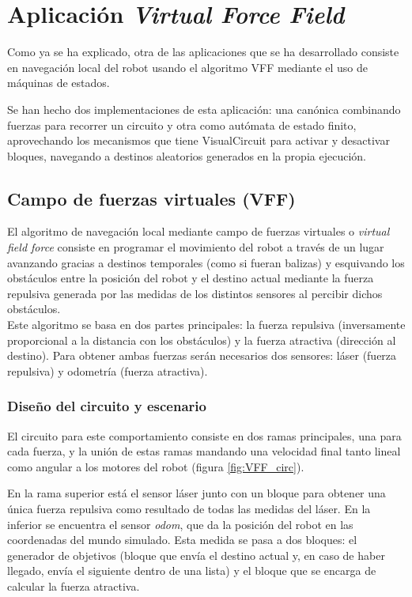 \chapter{Aplicación \textit{Virtual Force Field}}
\label{cap:capitulo6}
Como ya se ha explicado, otra de las aplicaciones que se ha desarrollado consiste en navegación local del robot usando el algoritmo VFF
mediante el uso de máquinas de estados.

Se han hecho dos implementaciones de esta aplicación: una canónica combinando fuerzas para recorrer un circuito y otra
como autómata de estado finito, aprovechando los mecanismos que tiene VisualCircuit para activar y desactivar bloques, navegando a destinos aleatorios
generados en la propia ejecución.

\section{Campo de fuerzas virtuales (VFF)}
\label{sec:VFF}

El algoritmo de navegación local mediante campo de fuerzas virtuales o \textit{virtual field force} consiste en programar el movimiento del robot a
través de un lugar avanzando gracias a destinos temporales (como si fueran balizas) y esquivando los obstáculos entre la posición del robot
y el destino actual mediante la fuerza repulsiva generada por las medidas de los distintos sensores al percibir dichos obstáculos.\\

Este algoritmo se basa en dos partes principales: la fuerza repulsiva (inversamente proporcional a la distancia con los obstáculos) y la
fuerza atractiva (dirección al destino). Para obtener ambas fuerzas serán necesarios dos sensores: láser (fuerza repulsiva) y odometría (fuerza atractiva).\\

\subsection{Diseño del circuito y escenario}
\label{subsec:dis_bloques_VFF}

El circuito para este comportamiento consiste en dos ramas principales, una para cada fuerza, y la unión de estas ramas mandando una velocidad
final tanto lineal como angular a los motores del robot (figura \ref{fig:VFF_circ}).\\

\newpage

En la rama superior está el sensor láser junto con un bloque para obtener una única fuerza repulsiva como resultado de todas las medidas del láser. En la inferior
se encuentra el sensor \textit{odom}, que da la posición del robot en las coordenadas del mundo simulado.
Esta medida se pasa a dos bloques: el generador de objetivos (bloque que envía el destino actual y, en caso de haber llegado, envía el siguiente dentro
de una lista) y el bloque que se encarga de calcular la fuerza atractiva.\\

